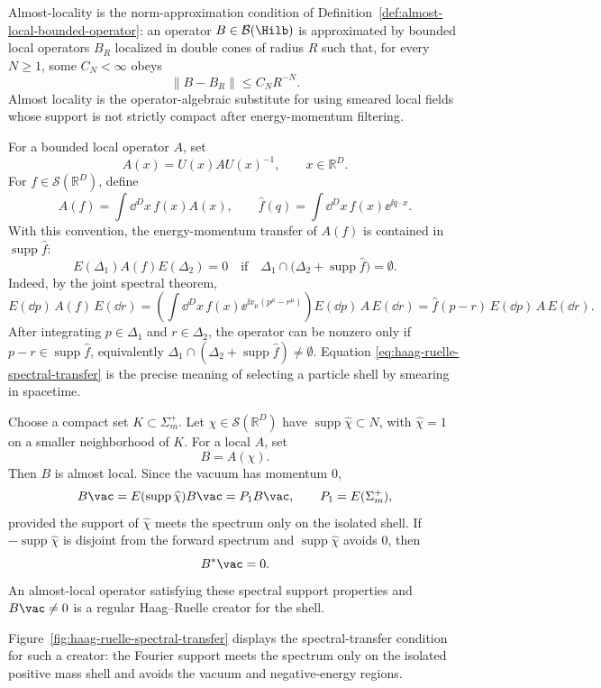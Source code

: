 Almost-locality is the norm-approximation condition of
Definition~\ref{def:almost-local-bounded-operator}: an operator
\(B\in\mathcal B(\Hilb)\) is approximated by bounded local operators \(B_R\)
localized in double cones of radius \(R\) such that, for every \(N\ge1\), some
\(C_N<\infty\) obeys
\[
  \|B-B_R\|\le C_N R^{-N}.
\]
Almost locality is the operator-algebraic substitute for using smeared local
fields whose support is not strictly compact after energy-momentum
filtering.

For a bounded local operator \(A\), set
\[
  A(x)=U(x)AU(x)^{-1},\qquad x\in\mathbb R^D .
\]
For \(f\in\mathcal S(\mathbb R^D)\), define
\[
  A(f)=\int\dd^D x\,f(x)A(x),
  \qquad
  \widehat f(q)=\int\dd^D x\,f(x)\ee^{\ii q\cdot x}.
\]
With this convention, the energy-momentum transfer of \(A(f)\) is contained
in \(\operatorname{supp}\widehat f\):
\begin{equation}
  E(\Delta_1)A(f)E(\Delta_2)=0
  \quad\text{if}\quad
  \Delta_1\cap
  \bigl(\Delta_2+\operatorname{supp}\widehat f\bigr)=\emptyset .
  \label{eq:haag-ruelle-spectral-transfer}
\end{equation}
Indeed, by the joint spectral theorem,
\[
  E(\dd p)\,A(f)\,E(\dd r)
  =
  \left(\int \dd^D x\,f(x)\ee^{\ii x_\mu(p^\mu-r^\mu)}\right)
  E(\dd p)\,A\,E(\dd r)
  =
  \widehat f(p-r)\,E(\dd p)\,A\,E(\dd r).
\]
After integrating \(p\in\Delta_1\) and \(r\in\Delta_2\), the operator can be
nonzero only if \(p-r\in\operatorname{supp}\widehat f\), equivalently
\(\Delta_1\cap(\Delta_2+\operatorname{supp}\widehat f)\ne\emptyset\).
Equation \eqref{eq:haag-ruelle-spectral-transfer} is the precise meaning of
selecting a particle shell by smearing in spacetime.

Choose a compact set \(K\subset\Sigma_m^+\).  Let \(\chi\in\mathcal S(\mathbb R^D)\)
have \(\operatorname{supp}\widehat\chi\subset N\), with
\(\widehat\chi=1\) on a smaller neighborhood of \(K\).  For a local \(A\),
set
\[
  B=A(\chi).
\]
Then \(B\) is almost local.  Since the vacuum has momentum \(0\),
\[
  B\vac=E(\operatorname{supp}\widehat\chi)B\vac=P_1B\vac,
  \qquad P_1=E(\Sigma_m^+),
\]
provided the support of \(\widehat\chi\) meets the spectrum only on the
isolated shell.  If \(-\operatorname{supp}\widehat\chi\) is disjoint from the
forward spectrum and \(\operatorname{supp}\widehat\chi\) avoids \(0\), then
\[
  B^*\vac=0 .
\]
An almost-local operator satisfying these spectral support properties and
\(B\vac\ne0\) is a regular Haag--Ruelle creator for the shell.

Figure~\ref{fig:haag-ruelle-spectral-transfer} displays the spectral-transfer
condition for such a creator: the Fourier support meets the spectrum only on
the isolated positive mass shell and avoids the vacuum and negative-energy
regions.

